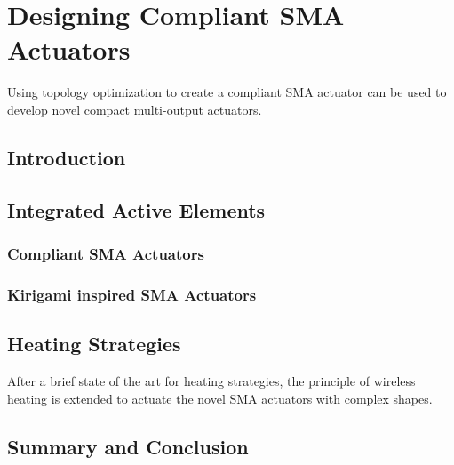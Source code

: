 
\chapter{Designing Compliant SMA Actuators}
Using topology optimization to create a compliant SMA actuator can be used to develop novel compact multi-output actuators.

\section{Introduction}
\section{Integrated Active Elements}
\subsection{Compliant SMA Actuators}
\subsection{Kirigami inspired SMA Actuators}

\section{Heating Strategies}
After a brief state of the art for heating strategies, the principle of wireless heating is extended to actuate the novel SMA actuators with complex shapes.
\section{Summary and Conclusion}
